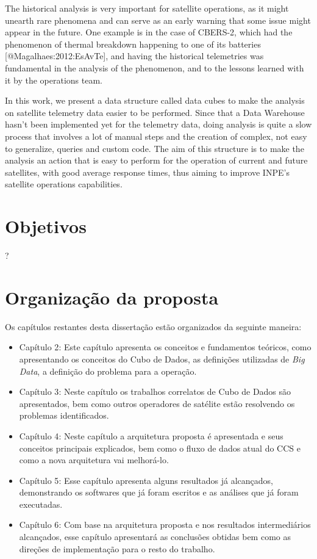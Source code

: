 The historical analysis is very important for satellite operations, as it might unearth rare phenomena and can serve as an early warning that some issue might appear in the future.
One example is in the case of CBERS-2, which had the phenomenon of thermal breakdown happening to one of its batteries [@Magalhaes:2012:EsAvTe], and having the historical telemetries was fundamental in the analysis of the phenomenon, and to the lessons learned with it by the operations team.

In this work, we present a data structure called data cubes to make the analysis on satellite telemetry data easier to be performed.
Since that a Data Warehouse hasn't been implemented yet for the telemetry data, doing analysis is quite a slow process that involves a lot of manual steps and the creation of complex, not easy to generalize, queries and custom code.
The aim of this structure is to make the analysis an action that is easy to perform for the operation of current and future satellites, with good average response times, thus aiming to improve INPE's satellite operations capabilities.

\section{Objetivos}

{\color{red} ?}

\section{Organização da proposta}

Os capítulos restantes desta dissertação estão organizados da seguinte maneira:

\begin{itemize}
	\item{Capítulo 2}: Este capítulo apresenta os conceitos e fundamentos teóricos, como apresentando os conceitos do Cubo de Dados, as definições utilizadas de \textit{Big Data}, a definição do problema para a operação.
	\item{Capítulo 3}: Neste capítulo os trabalhos correlatos de Cubo de Dados são apresentados, bem como outros operadores de satélite estão resolvendo os problemas identificados.
	\item{Capítulo 4}: Neste capítulo a arquitetura proposta é apresentada e seus conceitos principais explicados, bem como o fluxo de dados atual do CCS e como a nova arquitetura vai melhorá-lo.
	\item{Capítulo 5}: Esse capítulo apresenta alguns resultados já alcançados, demonstrando os softwares que já foram escritos e as análises que já foram executadas.
	\item{Capítulo 6}: Com base na arquitetura proposta e nos resultados intermediários alcançados, esse capítulo apresentará as conclusões obtidas bem como as direções de implementação para o resto do trabalho.
\end{itemize}

